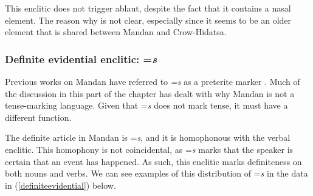 This enclitic does not trigger ablaut, despite the fact that it contains a nasal element. The reason why is not clear, especially since it seems to be an older element that is shared between Mandan and Crow-Hidatsa.

\subsubsection{Definite evidential enclitic: =\textit{s}}\label{SubSubSecDefiniteEvidential}

Previous works on Mandan have referred to \textit{=s} as a preterite marker \citep{kennard1936,hollow1970}. Much of the discussion in this part of the chapter has dealt with why Mandan is not a tense-marking language. Given that =\textit{s} does not mark tense, it must have a different function.

The definite article in Mandan is =\textit{s}, and it is homophonous with the verbal enclitic. This homophony is not coincidental, as =\textit{s} marks that the speaker is certain that an event has happened. As such, this enclitic marks definiteness on both nouns and verbs. We can see examples of this distribution of =\textit{s} in the data in (\ref{definiteevidential}) below.

